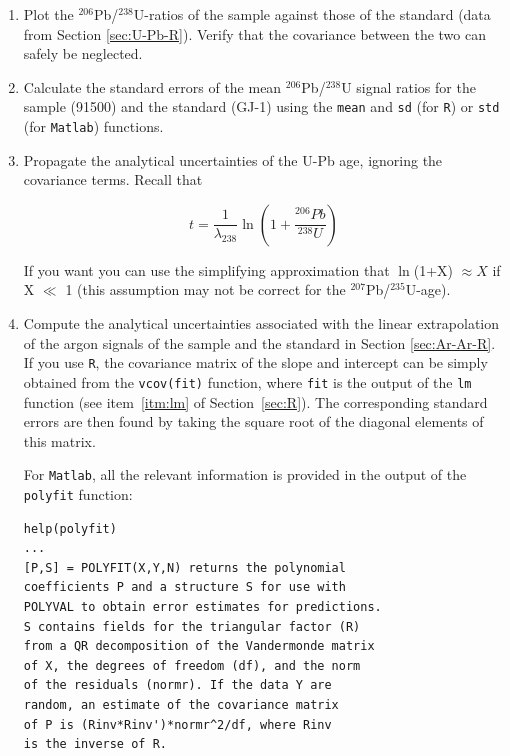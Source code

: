 \documentclass{book}
\begin{document}
\begin{enumerate}

\item Plot the $^{206}$Pb/$^{238}$U-ratios of the sample against those
  of the standard (data from Section \ref{sec:U-Pb-R}).  Verify that
  the covariance between the two can safely be neglected.

\item Calculate the standard errors of the mean $^{206}$Pb/$^{238}$U
  signal ratios for the sample (91500) and the standard (GJ-1) using
  the \texttt{mean} and \texttt{sd} (for \texttt{R}) or \texttt{std}
  (for \texttt{Matlab}) functions.

\item Propagate the analytical uncertainties of the U-Pb age, ignoring
  the covariance terms. Recall that 

$$ t = \frac{1}{\lambda_{238}}\ln\left(1 +
  \frac{{}^{206}Pb}{{}^{238}U}\right) $$

If you want you can use the simplifying approximation that $\ln$(1+X)
$\approx X$ if X $\ll$ 1 (this assumption may not be correct for the
$^{207}$Pb/$^{235}$U-age). \label{loglin}

\item Compute the analytical uncertainties associated with the linear
  extrapolation of the argon signals of the sample and the standard in
  Section \ref{sec:Ar-Ar-R}. If you use \texttt{R}, the covariance
  matrix of the slope and intercept can be simply obtained from the
  \texttt{vcov(fit)} function, where \texttt{fit} is the output of the
  \texttt{lm} function (see item~\ref{itm:lm} of
  Section~\ref{sec:R}). The corresponding standard errors are then
  found by taking the square root of the diagonal elements of this
  matrix.

  For \texttt{Matlab}, all the relevant information is provided in the
  output of the \texttt{polyfit} function:

\begin{verbatim}
help(polyfit)
...
[P,S] = POLYFIT(X,Y,N) returns the polynomial
coefficients P and a structure S for use with 
POLYVAL to obtain error estimates for predictions.  
S contains fields for the triangular factor (R)
from a QR decomposition of the Vandermonde matrix 
of X, the degrees of freedom (df), and the norm 
of the residuals (normr). If the data Y are 
random, an estimate of the covariance matrix 
of P is (Rinv*Rinv')*normr^2/df, where Rinv 
is the inverse of R.
\end{verbatim}


\end{enumerate}
\end{document}
